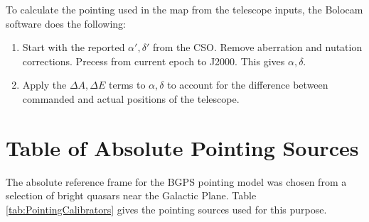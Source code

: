 \documentclass{emulateapj}
\begin{document}
To calculate the pointing used in the map from the telescope inputs,
the Bolocam software does the following:

\begin{enumerate}

\item Start with the reported $\alpha',\delta'$ from the CSO.  Remove
aberration and nutation corrections.  Precess from current epoch to
J2000.  This gives $\alpha,\delta$.

\item Apply the $\Delta A,\Delta E$ terms to $\alpha,\delta$ to
account for the difference between commanded and actual positions of
the telescope.

\end{enumerate}

\section{Table of Absolute Pointing Sources}
\label{app:PointingCalibrators}

The absolute reference frame for the BGPS pointing model was chosen
from a selection of bright quasars near the Galactic Plane.  Table
\ref{tab:PointingCalibrators} gives the pointing sources used for this
purpose.
\end{document}
